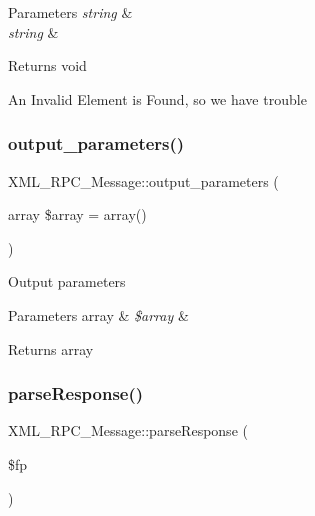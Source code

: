 \begin{DoxyParams}{Parameters}
{\em string} & \\
\hline
{\em string} & \\
\hline
\end{DoxyParams}
\begin{DoxyReturn}{Returns}
void 
\end{DoxyReturn}
An Invalid Element is Found, so we have trouble \mbox{\label{class_x_m_l___r_p_c___message_ace57a1119edc3c02c0ec48c04eb5e58c}} 
\subsubsection{\texorpdfstring{output\+\_\+parameters()}{output\_parameters()}}
{\footnotesize\ttfamily X\+M\+L\+\_\+\+R\+P\+C\+\_\+\+Message\+::output\+\_\+parameters (\begin{DoxyParamCaption}\item[{array}]{\$array = {\ttfamily array()} }\end{DoxyParamCaption})}

Output parameters


\begin{DoxyParams}[1]{Parameters}
array & {\em \$array} & \\
\hline
\end{DoxyParams}
\begin{DoxyReturn}{Returns}
array 
\end{DoxyReturn}
\mbox{\label{class_x_m_l___r_p_c___message_a9ba8d8355497c83a5cc812c72c6f3f1d}} 
\subsubsection{\texorpdfstring{parse\+Response()}{parseResponse()}}
{\footnotesize\ttfamily X\+M\+L\+\_\+\+R\+P\+C\+\_\+\+Message\+::parse\+Response (\begin{DoxyParamCaption}\item[{}]{\$fp }\end{DoxyParamCaption})}

